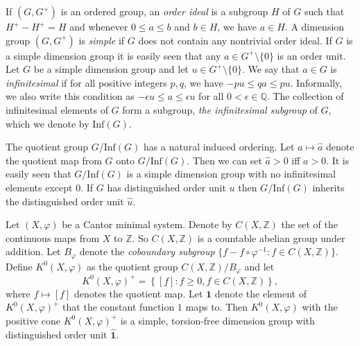 \documentclass{amsart}
\theoremstyle{definition}
\theoremstyle{problem}
\theoremstyle{remark}
\numberwithin{equation}{section}
\begin{document}
If $(G, G^+)$ is an ordered group, an {\em order ideal} is a subgroup $H$ of $G$ such that $H^+-H^+=H$ and whenever $0\leq a\leq b$ and $b\in H$, we have $a\in H$. A dimension group $(G,G^+)$ is {\em simple}   if $G$  does not contain any nontrivial order ideal. If $G$ is a simple dimension group
it is easily seen that any $a \in G^+\setminus \{0\}$ is an order unit.  Let $G$ be a simple dimension group and let $u \in G^+\setminus \{0\}$.  We say that $a \in G$ is {\em infinitesimal} if for all positive integers $p, q$, we have $-pu\leq qa\leq pu$. Informally, we also write this condition as $ -\epsilon u \le a \le \epsilon u$ for all $0<\epsilon \in \mathbb Q$.  The collection of infinitesimal elements of  $G$ form a subgroup,  {\em the infinitesimal subgroup} of $G$, which we denote by  $\mbox{Inf} (G)$. 

The quotient group $G /\mbox{Inf} (G)$ has a natural induced ordering. Let $a\mapsto \hat{a}$ denote the quotient map from $G$ onto $G/\mbox{Inf}(G)$. Then we can set $\hat{a} > 0$ iff $a > 0$. It is easily seen that $G /\mbox{Inf} (G)$ is a simple dimension group with no infinitesimal elements except 0. If $G$ has distinguished order unit $u$ then $G /\mbox{Inf} (G)$  inherits the distinguished order unit $\hat{u}$.

Let $(X, \varphi)$  be a Cantor minimal system.  Denote by $C(X, \mathbb Z)$ the  set of  the continuous maps from $X$ to $\mathbb Z$. So $C(X, \mathbb Z)$ is a countable abelian group under addition.  Let  $B_ \varphi$  denote the {\em coboundary subgroup} $\{f-f\circ  \varphi^{-1}\colon f \in C(X, \mathbb Z)\}$. Define  $K^0(X, \varphi)$ as the quotient group $C(X, \mathbb Z)/B_ \varphi$ and  let
$$K^0(X, \varphi)^+=\left\{ [f]\colon f  \ge 0, f \in C(X, \mathbb Z)\right\},$$
where $f\mapsto [f]$ denotes the  quotient map. Let $\mathbf 1$ denote the element of $K^0(X, \varphi)^+$  that the constant function $1$ maps to. Then
$K^0(X, \varphi)$ with the positive cone $K^0(X, \varphi)^+$ is a simple,  torsion-free dimension group with  distinguished order unit $\hat{\mathbf 1}$.  %
\end{document}
